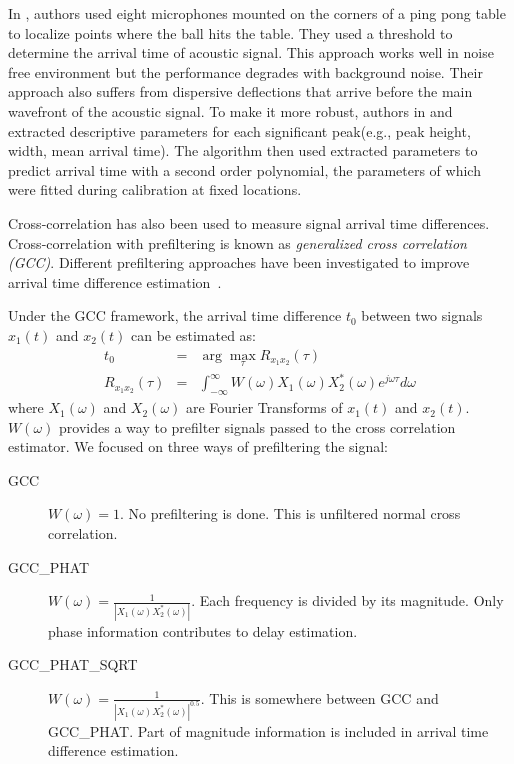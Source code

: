 In \cite{tdoa:ppp}, authors used eight microphones mounted on the corners of a ping pong table to localize points where the ball hits the table. They used a threshold to determine the arrival time of acoustic signal. This approach works well in noise free environment but the performance degrades with background noise. Their approach also suffers from dispersive deflections that arrive before the main wavefront of the acoustic signal. To make it more robust, authors in \cite{tdoa:mit3} and \cite{tdoa:mit4} extracted descriptive parameters for each significant peak(e.g., peak height, width, mean arrival time). The algorithm then used extracted parameters to predict arrival time with a second order polynomial, the parameters of which were fitted during calibration at fixed locations.

Cross-correlation has also been used to measure signal arrival time differences\cite{tdoa:mit2, tdoa:micloc, tdoa:3}. Cross-correlation with prefiltering is known as \emph{generalized cross correlation (GCC)}. Different prefiltering approaches have been investigated to improve arrival time difference estimation~\cite{tdoa:gcc1,tdoa:gcc2,tdoa:gcc3}.

Under the GCC framework, the arrival time difference $t_0$ between two signals $x_1(t)$ and $x_2(t)$ can be estimated as:
\begin{eqnarray} \label{eq:gcc}
t_0 &=& \arg\max_{\tau} R_{x_1x_2}(\tau) \\\label{eq:gcc2}
R_{x_1x_2}(\tau) &=& \int_{-\infty}^\infty W(\omega) X_1(\omega) X_2^{*}(\omega) e^{j\omega\tau} d\omega
\end{eqnarray}
where $X_1(\omega)$ and $X_2(\omega)$ are Fourier Transforms of $x_1(t)$ and $x_2(t)$. $W(\omega)$ provides a way to prefilter signals passed to the cross correlation estimator. We focused on three ways of prefiltering the signal:
\begin{description}%
\item[GCC] $W(\omega) = 1$. No prefiltering is done. This is unfiltered normal cross correlation.
\item[GCC\_PHAT] $W(\omega) = \frac{1}{\left|X_1(\omega)X_2^{*}(\omega)\right|}$. Each frequency is divided by its magnitude. Only phase information contributes to delay estimation.
\item[GCC\_PHAT\_SQRT] $W(\omega) = \frac{1}{\left|X_1(\omega)X_2^*(\omega)\right|^{0.5}}$. This is somewhere between GCC and GCC\_PHAT. Part of magnitude information is included in arrival time difference estimation.
\end{description}


